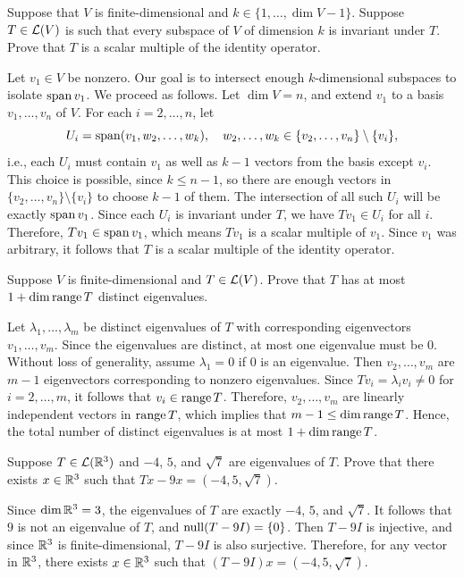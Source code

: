 \begin{exc}
\begin{exercise}
Suppose that $V$ is finite-dimensional and $k\in\{1,\dots,\dim V-1\}$. Suppose
$T\in\mathcal{L}(V)$ is such that every subspace of $V$ of dimension $k$ is invariant
under $T$. Prove that $T$ is a scalar multiple of the identity operator.
\end{exercise}
\begin{solution}
Let $v_1\in V$ be nonzero. Our goal is to intersect enough $k$-dimensional
subspaces to isolate $\operatorname{span} v_1$. We proceed as follows. Let $\dim V=n$, and
extend $v_1$ to a basis $v_1,\dots,v_n$ of $V$. For each $i=2,\dots,n$, let
\[ U_i = \operatorname{span}(v_1,w_2,\dots,w_k),\quad
   w_2,\dots,w_k\in\{v_2,\dots,v_n\}\setminus\{v_i\}, \]
i.e., each $U_i$ must contain $v_1$ as well as $k-1$ vectors from the basis
except $v_i$. This choice is possible, since $k\le n-1$, so there are enough
vectors in $\{v_2,\dots,v_n\}\setminus\{v_i\}$ to choose $k-1$ of them. The
intersection of all such $U_i$ will be exactly $\operatorname{span} v_1$. Since each $U_i$ is
invariant under $T$, we have $Tv_1\in U_i$ for all $i$. Therefore,
$Tv_1\in\operatorname{span} v_1$, which means $Tv_1$ is a scalar multiple of $v_1$. Since
$v_1$ was arbitrary, it follows that $T$ is a scalar multiple of the identity
operator.
\end{solution}

\begin{exercise}
Suppose $V$ is finite-dimensional and $T\in\mathcal{L}(V)$. Prove that $T$ has at
most $1+\operatorname{dim}\operatorname{range} T$ distinct eigenvalues.
\end{exercise}
\begin{solution}
Let $\lambda_1,\dots,\lambda_m$ be distinct eigenvalues of $T$ with
corresponding eigenvectors $v_1,\dots,v_m$. Since the eigenvalues are
distinct, at most one eigenvalue must be $0$. Without loss of generality,
assume $\lambda_1=0$ if $0$ is an eigenvalue. Then $v_2,\dots,v_m$ are $m-1$
eigenvectors corresponding to nonzero eigenvalues. Since
$Tv_i=\lambda_iv_i\ne0$ for $i=2,\dots,m$, it follows that $v_i\in\operatorname{range} T$.
Therefore, $v_2,\dots,v_m$ are linearly independent vectors in $\operatorname{range} T$,
which implies that $m-1\le\operatorname{dim}\operatorname{range} T$. Hence, the total number of distinct
eigenvalues is at most $1+\operatorname{dim}\operatorname{range} T$.
\end{solution}

\begin{exercise}
Suppose $T\in\mathcal{L}(\mathbb{R}^3)$ and $-4$, $5$, and $\sqrt7$ are eigenvalues of $T$.
Prove that there exists $x\in\mathbb{R}^3$ such that $Tx-9x=(-4,5,\sqrt7)$.
\end{exercise}
\begin{solution}
Since $\operatorname{dim}\mathbb{R}^3=3$, the eigenvalues of $T$ are exactly $-4$, $5$, and
$\sqrt7$. It follows that $9$ is not an eigenvalue of $T$, and
$\operatorname{null}(T-9I)=\{0\}$. Then $T-9I$ is injective, and since $\mathbb{R}^3$ is
finite-dimensional, $T-9I$ is also surjective. Therefore, for any vector in
$\mathbb{R}^3$, there exists $x\in\mathbb{R}^3$ such that $(T-9I)x=(-4,5,\sqrt7)$.
\end{solution}


\end{exc}

